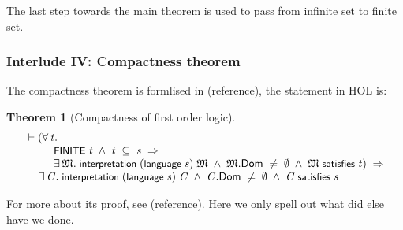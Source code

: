 \documentclass[letterpaper]{article}
\newtheorem{thm}{Theorem}
\renewcommand{\HOLConst}[1]{{\textsf{\upshape\small #1}}}
\newenvironment{holmath}{\begin{displaymath}\begin{array}{l}}{\end{array}\end{displaymath}\ignorespacesafterend}
\begin{document}
The last step towards the main theorem is used to pass from infinite set to finite set.
\subsubsection{Interlude IV: Compactness theorem}


The compactness theorem is formlised in (reference), the statement in HOL is:
\begin{thm}[Compactness of first order logic]
\begin{holmath}
  \ensuremath{\HOLTokenTurnstile}(\HOLSymConst{\HOLTokenForall{}}\HOLBoundVar{t}.\\
\;\;\;\;\;\;\;\;\;\;\HOLConst{FINITE}\;\HOLBoundVar{t}\;\HOLSymConst{\HOLTokenConj{}}\;\HOLBoundVar{t}\;\HOLSymConst{\HOLTokenSubset{}}\;\HOLFreeVar{s}\;\HOLSymConst{\HOLTokenImp{}}\\
\;\;\;\;\;\;\;\;\;\;\HOLSymConst{\HOLTokenExists{}}\HOLBoundVar{\ensuremath{\mathfrak{M}}}.\;\HOLConst{interpretation}\;(\HOLConst{language}\;\HOLFreeVar{s})\;\HOLBoundVar{\ensuremath{\mathfrak{M}}}\;\HOLSymConst{\HOLTokenConj{}}\;\HOLBoundVar{\ensuremath{\mathfrak{M}}}.\HOLFieldName{Dom}\;\HOLSymConst{\HOLTokenNotEqual{}}\;\HOLSymConst{\HOLTokenEmpty{}}\;\HOLSymConst{\HOLTokenConj{}}\;\HOLBoundVar{\ensuremath{\mathfrak{M}}}\;\HOLConst{satisfies}\;\HOLBoundVar{t})\;\HOLSymConst{\HOLTokenImp{}}\\
\;\;\;\;\;\HOLSymConst{\HOLTokenExists{}}\HOLBoundVar{C}.\;\HOLConst{interpretation}\;(\HOLConst{language}\;\HOLFreeVar{s})\;\HOLBoundVar{C}\;\HOLSymConst{\HOLTokenConj{}}\;\HOLBoundVar{C}.\HOLFieldName{Dom}\;\HOLSymConst{\HOLTokenNotEqual{}}\;\HOLSymConst{\HOLTokenEmpty{}}\;\HOLSymConst{\HOLTokenConj{}}\;\HOLBoundVar{C}\;\HOLConst{satisfies}\;\HOLFreeVar{s}
\end{holmath}
\end{thm}

For more about its proof, see (reference). Here we only spell out what did else have we done.
\end{document}
